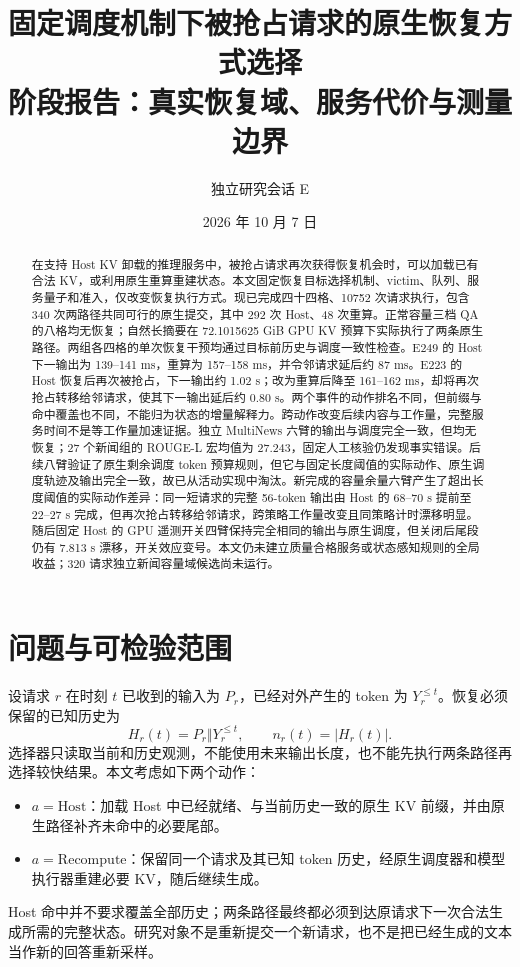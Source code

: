 \documentclass[UTF8,fontset=fandol,a4paper,10pt]{ctexart}
\title{固定调度机制下被抢占请求的原生恢复方式选择\\
\large 阶段报告：真实恢复域、服务代价与测量边界}
\author{独立研究会话 E}
\date{2026 年 10 月 7 日}
\begin{document}
\maketitle
\begin{abstract}
在支持 Host KV 卸载的推理服务中，被抢占请求再次获得恢复机会时，可以加载已有合法 KV，或利用原生重算重建状态。本文固定恢复目标选择机制、victim、队列、服务量子和准入，仅改变恢复执行方式。现已完成四十四格、10752 次请求执行，包含 340 次两路径共同可行的原生提交，其中 292 次 Host、48 次重算。正常容量三档 QA 的八格均无恢复；自然长摘要在 72.1015625 GiB GPU KV 预算下实际执行了两条原生路径。两组各四格的单次恢复干预均通过目标前历史与调度一致性检查。E249 的 Host 下一输出为 139--141 ms，重算为 157--158 ms，并令邻请求延后约 87 ms。E223 的 Host 恢复后再次被抢占，下一输出约 1.02 s；改为重算后降至 161--162 ms，却将再次抢占转移给邻请求，使其下一输出延后约 0.80 s。两个事件的动作排名不同，但前缀与命中覆盖也不同，不能归为状态的增量解释力。跨动作改变后续内容与工作量，完整服务时间不是等工作量加速证据。独立 MultiNews 六臂的输出与调度完全一致，但均无恢复；27 个新闻组的 ROUGE-L 宏均值为 27.243，固定人工核验仍发现事实错误。后续八臂验证了原生剩余调度 token 预算规则，但它与固定长度阈值的实际动作、原生调度轨迹及输出完全一致，故已从活动实现中淘汰。新完成的容量余量六臂产生了超出长度阈值的实际动作差异：同一短请求的完整 56-token 输出由 Host 的 68--70 s 提前至 22--27 s 完成，但再次抢占转移给邻请求，跨策略工作量改变且同策略计时漂移明显。随后固定 Host 的 GPU 遥测开关四臂保持完全相同的输出与原生调度，但关闭后尾段仍有 7.813 s 漂移，开关效应变号。本文仍未建立质量合格服务或状态感知规则的全局收益；320 请求独立新闻容量域候选尚未运行。
\end{abstract}

\section{问题与可检验范围}
\label{sec:problem}
设请求 $r$ 在时刻 $t$ 已收到的输入为 $P_r$，已经对外产生的 token 为 $Y_r^{\le t}$。恢复必须保留的已知历史为
\begin{equation}
 H_r(t)=P_r\Vert Y_r^{\le t},\qquad n_r(t)=|H_r(t)|.
\end{equation}
选择器只读取当前和历史观测，不能使用未来输出长度，也不能先执行两条路径再选择较快结果。本文考虑如下两个动作：
\begin{itemize}
 \item $a=\mathrm{Host}$：加载 Host 中已经就绪、与当前历史一致的原生 KV 前缀，并由原生路径补齐未命中的必要尾部。
 \item $a=\mathrm{Recompute}$：保留同一个请求及其已知 token 历史，经原生调度器和模型执行器重建必要 KV，随后继续生成。
\end{itemize}
Host 命中并不要求覆盖全部历史；两条路径最终都必须到达原请求下一次合法生成所需的完整状态。研究对象不是重新提交一个新请求，也不是把已经生成的文本当作新的回答重新采样。
\end{document}

